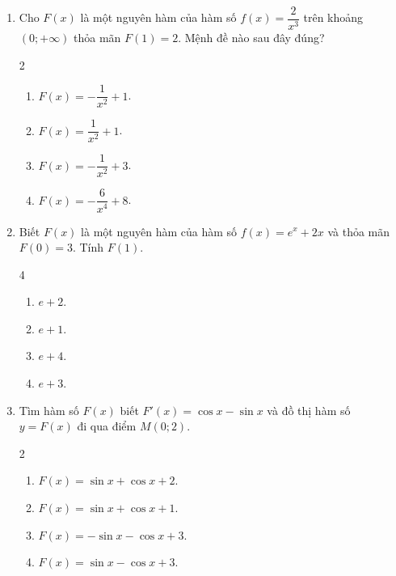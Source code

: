 \documentclass[12pt]{article}
\begin{document}
\begin{enumerate}[label=\textbf{Câu \arabic*.}]
\begin{multicols}{2}
\begin{enumerate}[label=\textbf{\Alph*.}]
				\item $F(x) = x^3 - x^2 + 5$.
				\item $F(x) = x^3 - x^2 - 1$.
				\item $F(x) = 6x - 2$.
				\item $F(x) = x^3 - x^2 + 1$.
			\end{enumerate}
		\end{multicols}
		
		\item Cho $F(x)$ là một nguyên hàm của hàm số $f(x) = \dfrac{2}{x^3}$ trên khoảng $(0; +\infty)$ thỏa mãn $F(1) = 2$. Mệnh đề nào sau đây đúng?
		\begin{multicols}{2}
			\begin{enumerate}[label=\textbf{\Alph*.}]
				
				\item $F(x) = -\dfrac{1}{x^2} + 1$.
				\item $F(x) = \dfrac{1}{x^2} + 1$.
				\item $F(x) = -\dfrac{1}{x^2} + 3$.
				\item $F(x) = -\dfrac{6}{x^4} + 8$.
			\end{enumerate}
		\end{multicols}
		
		\item Biết $F(x)$ là một nguyên hàm của hàm số $f(x) = e^x + 2x$ và thỏa mãn $F(0) = 3$. Tính $F(1)$.
		\begin{multicols}{4}
			\begin{enumerate}[label=\textbf{\Alph*.}]
				
				\item $e + 2$.
				\item $e + 1$.
				\item $e + 4$.
				\item $e + 3$.
			\end{enumerate}
		\end{multicols}
		
		\item Tìm hàm số $F(x)$ biết $F'(x) = \cos x - \sin x$ và đồ thị hàm số $y = F(x)$ đi qua điểm $M(0; 2)$.
		\begin{multicols}{2}
			\begin{enumerate}[label=\textbf{\Alph*.}]
				
				\item $F(x) = \sin x + \cos x + 2$.
				\item $F(x) = \sin x + \cos x + 1$.
				\item $F(x) = -\sin x - \cos x + 3$.
				\item $F(x) = \sin x - \cos x + 3$.
			\end{enumerate}
		\end{multicols}
		

\end{enumerate}
\end{document}
